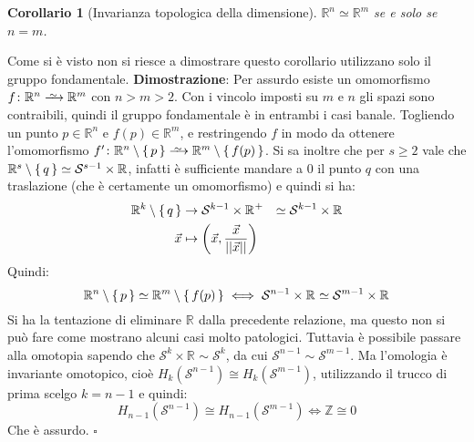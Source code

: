 \documentclass[10pt, twoside=false, x11names]{scrbook}
\newtheorem{corollary}[theorem]{Corollario}
\newenvironment{proof}{{\textbf{Dimostrazione}:}}{\hfill $\square$}
\newcommand{\Z}{\mathbb{Z}}
\newcommand{\RN}[1][]{\mathbb{R}^#1}
\newcommand{\Sph}[1][]{\mathcal{S}^#1}
\newcommand{\homoto}{\xrightarrow{\,\smash{\raisebox{-0.65ex}{\ensuremath{\scriptstyle\sim}}}\,}}
\begin{document}
\begin{corollary}[Invarianza topologica della dimensione]
  $ \RN{n} \simeq \RN{m} $ se e solo se $ n = m $.
\end{corollary}
Come si è visto non si riesce a dimostrare questo corollario
utilizzano solo il gruppo fondamentale.
\begin{proof}
  Per assurdo esiste un omomorfismo $ f \colon \RN{n} \homoto \RN{m} $ con $ n > m > 2 $.
  Con i vincolo imposti su $ m $ e $ n $ gli spazi sono contraibili, quindi il gruppo
  fondamentale è in entrambi i casi banale. Togliendo un punto $ p \in \RN{n} $ e
  $ f(p) \in \RN{m} $, e restringendo $ f $ in modo da ottenere l'omomorfismo
  $ f' \colon \RN{n} \setminus \set{p} \homoto \RN{m} \setminus \set{f(p)} $.
  Si sa inoltre che per $ s \geq 2 $ vale che $ \RN{s} \setminus \set{q} \simeq \Sph{s-1} \times \RN{} $,
  infatti è sufficiente mandare a $ 0 $ il punto $ q $ con una traslazione
  (che è certamente un omomorfismo) e quindi si ha:
  \[
    \begin{aligned}[t]
      \RN{k} \setminus \set{q} & \to  \Sph{k-1} \times {\RN{}}^+ & \simeq \Sph{k-1} \times \RN{} \\
      \vec{x} & \mapsto \left( \vec{x}, \frac{\vec{x}}{|| \vec{x} ||} \right) &
    \end{aligned}
  \]
  Quindi:
  \[
    \RN{n} \setminus \set{p} \simeq \RN{m} \setminus \set{f(p)} \iff \Sph{n-1} \times \RN{} \simeq \Sph{m-1} \times \RN{}
  \]
  Si ha la tentazione di eliminare $ \RN{} $ dalla precedente relazione, ma
  questo non si può fare come mostrano alcuni casi molto patologici.
  Tuttavia è possibile passare alla omotopia sapendo che $ \Sph{k} \times \RN{} \sim \Sph{k} $,
  da cui $ \Sph{n-1} \sim \Sph{m-1} $. Ma l'omologia è invariante omotopico, cioè
  $ H_k(\Sph{n-1}) \cong H_k(\Sph{m-1}) $, utilizzando il trucco di prima scelgo $ k = n-1 $
  e quindi:
  \[
    H_{n-1}(\Sph{n-1}) \cong H_{n-1}(\Sph{m-1}) \iff \Z \cong 0
  \]
  Che è assurdo.
\end{proof}
\end{document}
